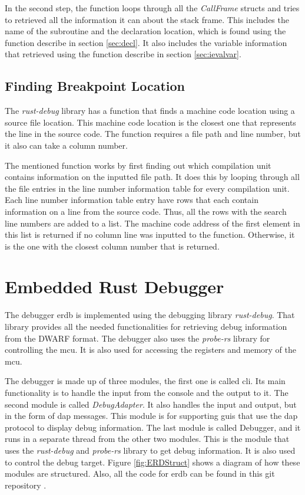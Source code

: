 In the second step, the function loops through all the \emph{CallFrame} structs and tries to retrieved all the information it can about the stack frame.
This includes the name of the subroutine and the declaration location, which is found using the function describe in section \ref{sec:decl}.
It also includes the variable information that retrieved using the function describe in section \ref{sec:ievalvar}.



\subsection{Finding Breakpoint Location} %
The \emph{rust-debug} library has a function that finds a machine code location using a source file location.
This machine code location is the closest one that represents the line in the source code.
The function requires a file path and line number, but it also can take a column number.


The mentioned function works by first finding out which compilation unit contains information on the inputted file path.
It does this by looping through all the file entries in the line number information table for every compilation unit.
Each line number information table entry have rows that each contain information on a line from the source code.
Thus, all the rows with the search line numbers are added to a list.
The machine code address of the first element in this list is returned if no column line was inputted to the function.
Otherwise, it is the one with the closest column number that is returned.




\section{Embedded Rust Debugger}
The debugger \acrfull{erdb} is implemented using the debugging library \emph{rust-debug}.
That library provides all the needed functionalities for retrieving debug information from the \gls{DWARF} format.
The debugger also uses the \emph{probe-rs} library for controlling the \gls{mcu}.
It is also used for accessing the registers and memory of the \gls{mcu}.


The debugger is made up of three modules, the first one is called \acrshort{cli}.
Its main functionality is to handle the input from the console and the output to it.
The second module is called \emph{DebugAdapter}.
It also handles the input and output, but in the form of \gls{dap} messages.
This module is for supporting \glspl{gui} that use the \gls{dap} protocol to display debug information.
The last module is called Debugger, and it runs in a separate thread from the other two modules.
This is the module that uses the \emph{rust-debug} and \emph{probe-rs} library to get debug information.
It is also used to control the debug target.
Figure \ref{fig:ERDStruct} shows a diagram of how these modules are structured.
Also, all the code for \gls{erdb} can be found in this git repository \cite{erdb}.



